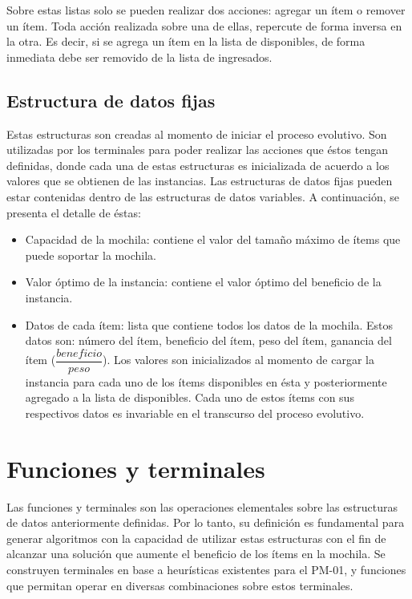 Sobre estas listas solo se pueden realizar dos acciones: agregar un ítem o remover un ítem. Toda acción realizada sobre una de ellas, repercute de forma inversa en la otra. Es decir, si se agrega un ítem en la lista de disponibles, de forma inmediata debe ser removido de la lista de ingresados.

\subsection{Estructura de datos fijas}

Estas estructuras son creadas al momento de iniciar el proceso evolutivo. Son utilizadas por los terminales para poder realizar las acciones que éstos tengan definidas, donde cada una de estas estructuras es inicializada de acuerdo a los valores que se obtienen de las instancias. Las estructuras de datos fijas pueden estar contenidas dentro de las estructuras de datos variables. A continuación, se presenta el detalle de éstas:

\begin{itemize}
	\item Capacidad de la mochila: contiene el valor del tamaño máximo de ítems que puede soportar la mochila.
	\item Valor óptimo de la instancia: contiene el valor óptimo del beneficio de la instancia.
	\item Datos de cada ítem: lista que contiene todos los datos de la mochila. Estos datos son: número del ítem, beneficio del ítem, peso del ítem, ganancia del ítem ($\dfrac{beneficio}{peso}$). Los valores son inicializados al momento de cargar la instancia para cada uno de los ítems disponibles en ésta y posteriormente agregado a la lista de disponibles. Cada uno de estos ítems con sus respectivos datos es invariable en el transcurso del proceso evolutivo.
\end{itemize}

\section{Funciones y terminales}

Las funciones y terminales son las operaciones elementales sobre las estructuras de datos anteriormente definidas. Por lo tanto, su definición es fundamental para generar algoritmos con la capacidad de utilizar estas estructuras con el fin de alcanzar una solución que aumente el beneficio de los ítems en la mochila. Se construyen terminales en base a heurísticas existentes para el PM-01, y funciones que permitan operar en diversas combinaciones sobre estos terminales.

